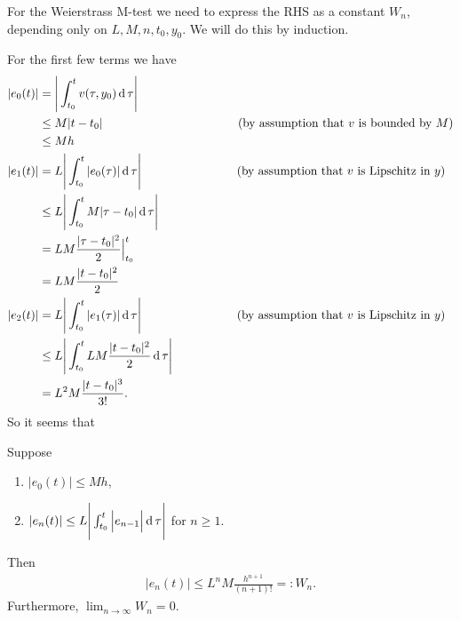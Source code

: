For the Weierstrass M-test we need to express the RHS as a constant $W_n$,
depending only on $L, M, n, t_0, y_0$. We will do this by induction.

For the first few terms we have
\begin{align*}
  |e_0(t)| &    = \Bigg|\int_{t_0}^t v(\tau, y_0) \operatorname{\text{d}}\tau\Bigg|\\
           & \leq M|t - t_0| ~~~~~~~~~~~~~~~~~~~~~~~~~~~~~~~~~~\text{(by assumption that $v$ is bounded by $M$)}\\
           & \leq Mh\\
  |e_1(t)| &    = L\Bigg|\int_{t_0}^t |e_0(\tau)| \operatorname{\text{d}}\tau\Bigg|  ~~~~~~~~~~~~~~~~~~~~~~~~\text{(by assumption that $v$ is Lipschitz in $y$)}\\
           & \leq L\Bigg|\int_{t_0}^t M|\tau - t_0| \operatorname{\text{d}}\tau\Bigg|\\
           &    = LM\frac{|\tau - t_0|^2}{2} \Big|_{t_0}^t \\
           &    = LM\frac{|t - t_0|^2}{2} \\
  |e_2(t)| &    = L\Bigg|\int_{t_0}^t |e_1(\tau)| \operatorname{\text{d}}\tau\Bigg|  ~~~~~~~~~~~~~~~~~~~~~~~~\text{(by assumption that $v$ is Lipschitz in $y$)}\\
           & \leq L\Bigg|\int_{t_0}^t LM\frac{|t - t_0|^2}{2} \operatorname{\text{d}}\tau\Bigg|\\
           &    = L^2M\frac{|t - t_0|^3}{3!}.
\end{align*}
So it seems that\\

\begin{lemma} \label{picard-convergence-induction}
Suppose
\begin{enumerate}
\item $|e_0(t)| \leq Mh$,
\item $|e_n(t)| \leq L\Bigg|\int_{t_0}^t \Big|e_{n-1}\Big| \operatorname{\text{d}}\tau \Bigg|$ for $n \geq 1$.
\end{enumerate}
Then
\begin{align*}
|e_n(t)| \leq L^nM\frac{h^{n+1}}{(n+1)!} =: W_n.
\end{align*}
Furthermore, $\lim_{n\to\infty}W_n = 0$.
\end{lemma}

